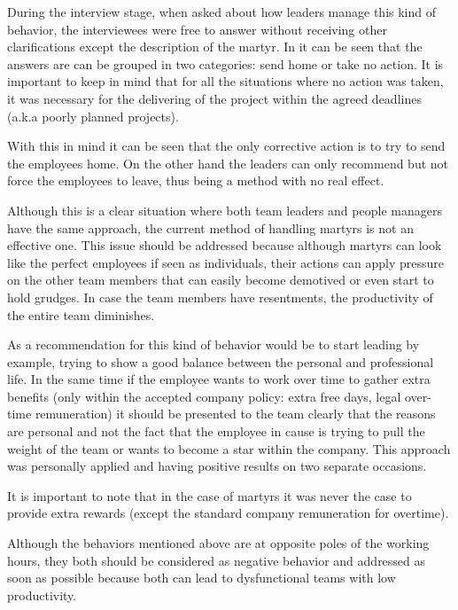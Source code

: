 During the interview stage, when asked about how leaders manage this kind of behavior, the interviewees were free to answer without receiving other clarifications except the description of the martyr. In  it can be seen that the answers are can be grouped in two categories: send home or take no action. 
It is important to keep in mind that for all the situations where no action was taken, it was necessary for the delivering of the project within the agreed deadlines (a.k.a poorly planned projects).

With this in mind it can be seen that the only corrective action is to try to send the employees home. On the other hand the leaders can only recommend but not force the employees to leave, thus being a method with no real effect. 

Although this is a clear situation where both team leaders and people managers have the same approach, the current method of handling martyrs is not an effective one. This issue should be addressed because although martyrs can look like the perfect employees if seen as individuals, their actions can apply pressure on the other team members that can easily become demotived or even start to hold grudges. In case the team members have resentments, the productivity of the entire team diminishes. 

As a recommendation for this kind of behavior would be to start leading by example, trying to show a good balance between the personal and professional life. In the same time if the employee wants to work over time to gather extra benefits (only within the accepted company policy: extra free days, legal over-time remuneration) it should be presented to the team clearly that the reasons are personal and not the fact that the employee in cause is trying to pull the weight of the team or wants to become a star within the company. This approach was personally applied and having positive results on two separate occasions.

It is important to note that in the case of martyrs it was never the case to provide extra rewards (except the standard company remuneration for overtime).

Although the behaviors mentioned above are at opposite poles of the working hours, they both should be considered as negative behavior and addressed as soon as possible because both can lead to dysfunctional teams with low productivity.

